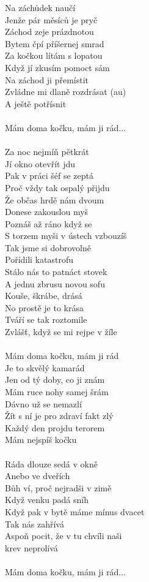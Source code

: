\begin{multicols}{2}
Na záchůdek naučí\\
Jenže pár měsíců je pryč\\
Záchod zeje prázdnotou\\
Bytem čpí příšernej smrad\\
Za kočkou lítám s lopatou\\
Když jí zkusím pomoct sám\\
Na záchod ji přemístit\\
Zvládne mi dlaně rozdrásat (au)\\
A ještě potřísnit\\
\\
Mám doma kočku, mám ji rád...\\
\\
Za noc nejmíň pětkrát\\
Jí okno otevřít jdu\\
Pak v práci šéf se zeptá\\
Proč vždy tak ospalý přijdu\\
Že občas hrdě nám dvoum\\
Donese zakouslou myš\\
Poznáš až ráno když se\\
S torzem myši v ústech vzbouzíš\\
Tak jsme si dobrovolně\\
Pořídili katastrofu\\
Stálo nás to patnáct stovek\\
A jednu zbrusu novou sofu\\
Kouše, škrábe, drásá\\
No prostě je to krása\\
Tváří se tak roztomile\\
Zvlášť, když se mi rejpe v žíle\\
\\
Mám doma kočku, mám ji rád\\
Je to skvělý kamarád\\
Jen od tý doby, co ji znám\\
Mám ruce nohy samej šrám\\
Dávno už se nemazlí\\
Žít s ní je pro zdraví fakt zlý\\
Každý den projdu terorem\\
Mám nejspíš kočku\\
\\
Ráda dlouze sedá v okně\\
Anebo ve dveřích\\
Bůh ví, proč nejradši v zimě\\
Když venku padá sníh\\
Když pak v bytě máme mínus dvacet\\
Tak nás zahřívá\\
Aspoň pocit, že v tu chvíli naši\\
krev neprolívá\\
\\
Mám doma kočku, mám ji rád...\\
\end{multicols}
